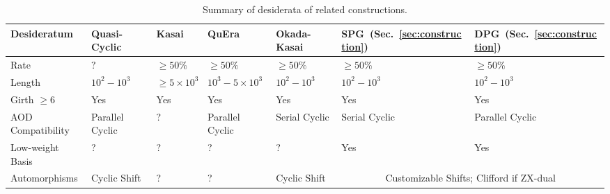 \begin{table}
\centering
\begin{tabular}{lllllll}
\toprule
Desideratum &  Quasi-Cyclic \cite{Hagiwara_2007}&Kasai \cite{kasai2026breakingorthogonalitybarrierquantum}
& QuEra
\cite{zhao2026ultrahighratequantumerrorcorrection} & Okada-Kasai \cite{okada2026pairpartitionconstructionscpmbasedquantum}&SPG~(Sec.~\ref{sec:construction})&DPG~(Sec.~\ref{sec:construction})\\\midrule
Rate& \color{purple}$?$&\color{teal} $\geq 50\%$& \color{teal}$\geq 50\%$&\color{teal}$\geq 50\%$& \color{teal}$\geq 50\%$&\color{teal}$\geq 50\%$\\
Length& \color{teal} $10^2 - 10^3$& \color{purple} $\geq 5\times 10^3$& \color{olive} $10^3-5\times 10^3$& \color{teal} $10^2 - 10^3$& \color{teal} $10^2 - 10^3$&\color{teal} $10^2 - 10^3$\\
Girth $\geq 6$&  {\color{teal}Yes} &{\color{teal}Yes} & {\color{teal}Yes} &{\color{teal}Yes} & {\color{teal}Yes} &{\color{teal}Yes} \\
AOD Compatibility&  {\color{teal}Parallel Cyclic}&\color{purple}?& \color{teal}Parallel Cyclic &\color{olive}Serial Cyclic& \color{olive}Serial Cyclic&{\color{teal}Parallel Cyclic}\\
Low-weight Basis&  \color{purple}?&\color{purple}?& \color{purple}?&\color{purple}?& {\color{teal}Yes} &{\color{teal} Yes}\\
 Automorphisms& \color{olive} Cyclic Shift & \color{purple}?&\color{purple}?& \color{olive}Cyclic Shift& \multicolumn{2}{c}{\color{teal} Customizable Shifts; Clifford if ZX-dual}\\
\bottomrule
\end{tabular}
\caption{Summary of desiderata of related constructions.}
\label{tab:comparison}
\end{table}

